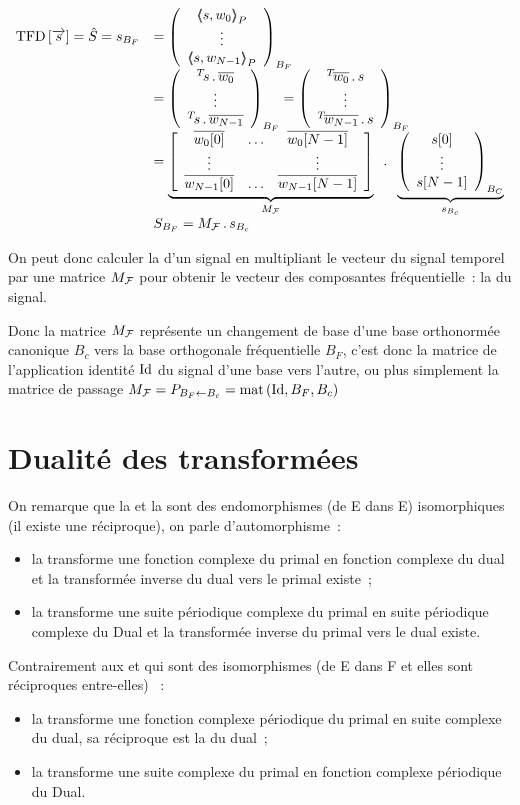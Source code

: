 \begin{equation}
  \label{eq:tfd_matrice}
  \begin{array}{ll}
    \mTFD\b{\vec{s}} = \hat{S}=s_{B_F}&=\vvvectBase{\scaldp{s}{w_0}}{\vdots}{\scaldp{s}{w_{N-1}}}{B_F}\\
    &= \vvvectBase{\Tr{s} \, .\, \conj{w_0}}{\vdots}{\Tr{s} \, .\, \conj{w_{N-1}}}{B_F} = \vvvectBase{\Tr{\conj{w_0}} \, .\, s}{\vdots}{\Tr{\conj{w_{N-1}}} \, .\, s}{B_F}  \\
                                      &=\caCest{\b{\mmmaaatrice{\conj{w_0[0]}}{\ldots}{\conj{w_0[N-1]}}{\vdots}{}{\vdots}{\conj{w_{N-1}[0]}}{\ldots}{\conj{w_{N-1}[N-1]}}}}{M_{\F}}\;\;.\;\; \caCest{\vvvectBase{s[0]}{\vdots}{s[N-1]}{B_C}}{s_{B_c}} \\
    &S_{B_F} = M_{\F}\,.\,s_{B_c} 
  \end{array}
\end{equation}

On peut donc calculer la \TFD{} d'un signal en multipliant le vecteur du signal temporel par une matrice $M_{\mathcal{F}}$ pour obtenir le vecteur des composantes fréquentielle~: la \TFD{} du signal.

Donc la matrice $M_{\mathcal{F}}$ représente un changement de base d'une base orthonormée canonique $B_c$ vers la  base orthogonale fréquentielle $B_F$, c'est donc la matrice de l'application identité $\mathrm{Id}$ du signal d'une base vers l'autre, ou plus simplement la matrice de passage $M_{\mathcal{F}} = P_{B_F\leftarrow B_c} = \mathop{\mathrm{mat}}\left(\mathrm{Id},B_F,B_c\right)$
\section{Dualité des transformées}

On remarque que la \TF{} et la \TFD{} sont des endomorphismes (de E dans E) isomorphiques (il existe une réciproque), on parle d'automorphisme~:
\begin{itemize}
\item la \TF{} transforme une fonction complexe du primal  en fonction complexe du dual et la transformée inverse du dual vers le primal existe~;
\item la \TFD{} transforme une suite périodique complexe du primal en suite périodique complexe du Dual et la transformée inverse du primal vers le dual existe.
\end{itemize}

Contrairement aux \sdf{} et \TFSD{} qui sont des isomorphismes (de E dans F et elles sont réciproques entre-elles) ~:
\begin{itemize}
\item la \sdf{} transforme une fonction complexe périodique du primal  en suite complexe du dual, sa réciproque est la \TFD{} du dual~;
\item la \TFSD{} transforme une suite complexe du primal en fonction complexe périodique du Dual.
\end{itemize}

